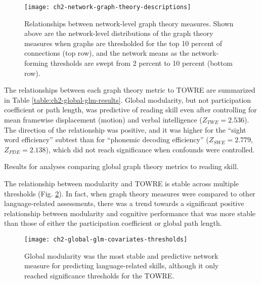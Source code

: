 \begin{figure}[t]
    \centering
    \texttt{[image: ch2-network-graph-theory-descriptions]}
    \caption[Relationships between network-level graph theory measures.]{Relationships between network-level graph theory measures. Shown above are the network-level distributions of the graph theory measures when graphs are thresholded for the top 10 percent of connections (top row), and the network means as the network-forming thresholds are swept from 2 percent to 10 percent (bottom row).}
    \label{fig:ch2-network-graph-theory-descriptions}
\end{figure}

The relationships between each graph theory metric to TOWRE are summarized in Table \ref{table:ch2-global-glm-results}. Global modularity, but not participation coefficient or path length, was predictive of reading skill even after controlling for mean framewise displacement (motion) and verbal intelligence ($Z_{TWE} = 2.536$). The direction of the relationship was positive, and it was higher for the ``sight word efficiency'' subtest than for ``phonemic decoding efficiency'' ($Z_{SWE} = 2.779$, $Z_{PDE} = 2.138$), which did not reach significance when confounds were controlled. 

\begin{table}[t]
    \renewcommand{\tabcolsep}{0.09cm}
    \centering
    
    \caption{Results for analyses comparing global graph theory metrics to reading skill.}
    \label{table:ch2-global-glm-results}
\end{table}

The relationship between modularity and TOWRE is stable across multiple thresholds (Fig. \ref{fig:ch2-global-glm-covariates-thresh}). In fact, when graph theory measures were compared to other language-related assessments, there was a trend towards a significant positive relationship between modularity and cognitive performance that was more stable than those of either the participation coefficient or global path length. 

\begin{figure}[t]
    \centering
    \texttt{[image: ch2-global-glm-covariates-thresholds]}
    \caption[Modularity metrics at rest are the best predictors of cognitive skills.] {Global modularity was the most stable and predictive network measure for predicting language-related skills, although it only reached significance thresholds for the TOWRE.}
    \label{fig:ch2-global-glm-covariates-thresh}
\end{figure}

